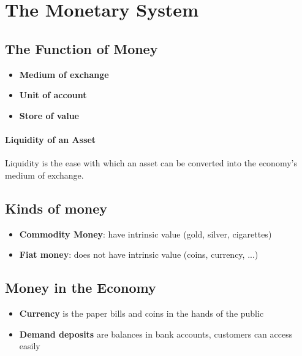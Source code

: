 \documentclass[a4paper,titlepage] {scrartcl}
\begin{document}
\section{The Monetary System}

\subsection{The Function of Money} %
\label{sub:the_function_of_money}

\begin{itemize}
	\item \textbf{Medium of exchange}
	\item \textbf{Unit of account}
	\item \textbf{Store of value}
\end{itemize}

\paragraph{Liquidity of an Asset} %
\label{par:liquidity_of_an_asset}
Liquidity is the ease with which an asset can be converted into the 
economy’s medium of exchange. 


\subsection{Kinds of money}
\begin{itemize}
	\item \textbf{Commodity Money}: have intrinsic value (gold, silver, cigarettes)
	\item \textbf{Fiat money}: does not have intrinsic value (coins, currency, ...)
\end{itemize}



\subsection{Money in the Economy} %
\label{sub:money_in_the_economy}

\begin{itemize}
	\item \textbf{Currency} is the paper bills and coins in the hands of the public
	\item \textbf{Demand deposits} are balances in bank accounts, customers can access easily
\end{itemize}
\end{document}
